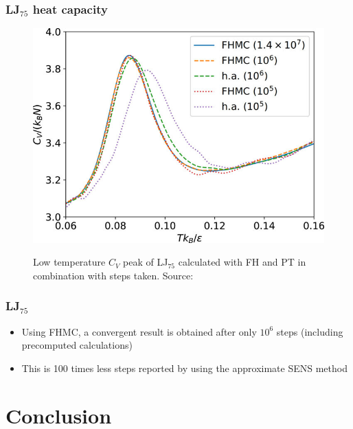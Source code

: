 \documentclass{beamer}
\begin{document}
 	\begin{frame}
 		\frametitle{LJ$_{75}$ heat capacity}
 		\begin{figure}
			\center
			\includegraphics[height=0.85\textheight]{figures/LJ75_Cv_low.jpg}
			\label{fig:LJ75_Cv_low}
			\caption{Low temperature $C_V$ peak of LJ$_{75}$ calculated with FH and PT in combination with steps taken. Source: \cite{Finkler2020}}
		\end{figure}
 	\end{frame}

 	\begin{frame}
 		\frametitle{LJ$_{75}$}
 		\begin{itemize}
 			\item Using FHMC, a convergent result is obtained after only $10^6$ steps (including precomputed calculations)
 			\item This is 100 times less steps reported by \citeauthor{Martiniani2014} \cite{Martiniani2014} using the approximate SENS method
		\end{itemize}
	\end{frame}

	\section{Conclusion}













\begin{frame}
  	\printbibliography[heading=bibintoc]

  \end{frame}
\end{document}
